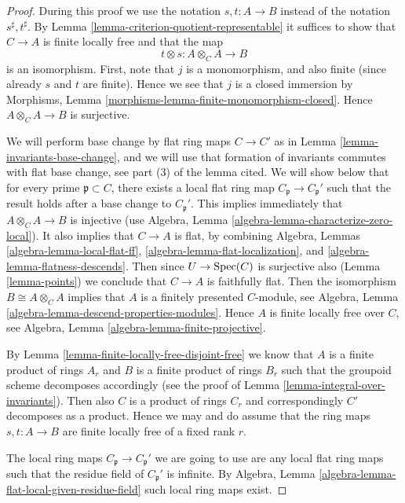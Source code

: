 \begin{proof}
During this proof we use the notation $s, t : A \to B$
instead of the notation $s^\sharp, t^\sharp$.
By Lemma \ref{lemma-criterion-quotient-representable}
it suffices to show that $C \to A$ is finite locally free
and that the map
$$
t \otimes s : A \otimes_C A \longrightarrow B
$$
is an isomorphism. First, note that $j$ is a monomorphism, and
also finite (since already $s$ and $t$ are finite). Hence we see
that $j$ is a closed immersion by
Morphisms, Lemma \ref{morphisms-lemma-finite-monomorphism-closed}.
Hence $A \otimes_C A \to B$ is surjective.

\medskip\noindent
We will perform base change by flat ring maps $C \to C'$ as in
Lemma \ref{lemma-invariants-base-change}, and we will use that
formation of invariants commutes with flat base change, see
part (3) of the lemma cited.
We will show below that for every prime $\mathfrak p \subset C$, there exists
a local flat ring map $C_{\mathfrak p} \to C_{\mathfrak p}'$
such that the result holds after a base change to $C_{\mathfrak p}'$.
This implies immediately
that $A \otimes_C A \to B$ is injective (use
Algebra, Lemma \ref{algebra-lemma-characterize-zero-local}).
It also implies that $C \to A$ is flat, by combining
Algebra, Lemmas \ref{algebra-lemma-local-flat-ff},
\ref{algebra-lemma-flat-localization}, and
\ref{algebra-lemma-flatness-descends}. Then since $U \to \mathop{\mathrm{Spec}}(C)$
is surjective also (Lemma \ref{lemma-points}) we conclude that $C \to A$
is faithfully flat. Then the isomorphism $B \cong A \otimes_C A$
implies that $A$ is a finitely presented $C$-module, see
Algebra, Lemma \ref{algebra-lemma-descend-properties-modules}.
Hence $A$ is finite locally free over $C$, see
Algebra, Lemma \ref{algebra-lemma-finite-projective}.

\medskip\noindent
By Lemma \ref{lemma-finite-locally-free-disjoint-free}
we know that $A$ is a finite
product of rings $A_r$ and $B$ is a finite product of rings $B_r$
such that the groupoid scheme decomposes accordingly (see the proof
of Lemma \ref{lemma-integral-over-invariants}).
Then also $C$ is a product of rings $C_r$ and
correspondingly $C'$ decomposes as a product. Hence we may and do
assume that the ring maps $s, t : A \to B$ are finite
locally free of a fixed rank $r$.

\medskip\noindent
The local ring maps $C_{\mathfrak p} \to C_{\mathfrak p}'$ we are going
to use are any local flat ring maps such that the residue field of
$C_{\mathfrak p}'$ is infinite.
By Algebra, Lemma \ref{algebra-lemma-flat-local-given-residue-field}
such local ring maps exist.


\end{proof}
